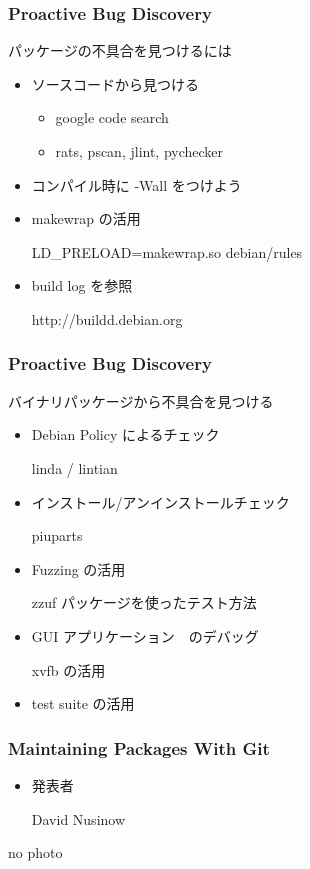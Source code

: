 \documentclass[cjk,dvipdfmx,12pt]{beamer}
\begin{document}
\begin{frame} 
\frametitle{Proactive Bug Discovery}
  パッケージの不具合を見つけるには

  \begin{itemize}
    \item ソースコードから見つける
	\begin{itemize}
	  \item google code search
	  \item rats, pscan, jlint, pychecker
	\end{itemize}

    \item コンパイル時に -Wall をつけよう
    \item makewrap の活用
	
	LD\_PRELOAD=makewrap.so debian/rules
	
    \item build log を参照

	http://buildd.debian.org

  \end{itemize}	
\end{frame}


\begin{frame} 
\frametitle{Proactive Bug Discovery}
  バイナリパッケージから不具合を見つける

  \begin{itemize}
    \item Debian Policy によるチェック
	
	linda / lintian
	
    \item インストール/アンインストールチェック

	piuparts

    \item Fuzzing の活用
	
	zzuf パッケージを使ったテスト方法

    \item GUI アプリケーション　のデバッグ
	
	xvfb の活用

    \item test suite の活用

  \end{itemize}	
\end{frame}


\begin{frame} 
\frametitle{Maintaining Packages With Git}
  \begin{minipage}{0.4\hsize}
    \begin{itemize}
      \item 発表者

	David Nusinow
    \end{itemize}
  \end{minipage}
  \begin{minipage}{0.4\hsize}
    no photo
  \end{minipage}
\end{frame}
\end{document}
